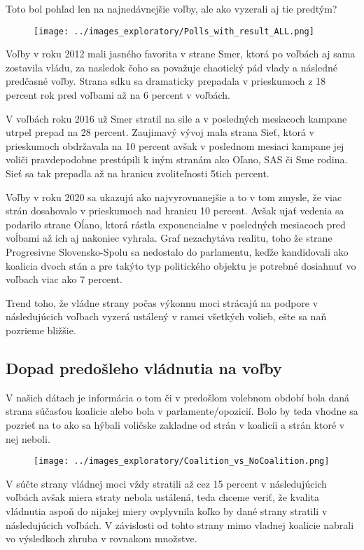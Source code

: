 \documentclass[main.tex]{subfiles}
\begin{document}
Toto bol pohľad len na najnedávnejšie voľby, ale ako vyzerali aj tie predtým?

\clearpage


\begin{figure}[!htbp]
    \centering
    \texttt{[image: ../images\_exploratory/Polls\_with\_result\_ALL.png]}
    \caption{}
    \label{fig:example}
\end{figure}

Voľby v roku 2012 mali jasného favorita v strane Smer, ktorá po voľbách aj sama zostavila vládu, za nasledok čoho sa považuje chaotický pád vlady a následné predčasné voľby. Strana sdku sa dramaticky prepadala v prieskumoch z 18 percent rok pred voľbami až na 6 percent v voľbách. 

V voľbách roku 2016 už Smer stratil na sile a v posledných mesiacoch kampane utrpel prepad na 28 percent. Zaujimavý vývoj mala strana Sieť, ktorá v prieskumoch obdržavala na 10 percent avšak v poslednom mesiaci kampane jej voliči pravdepodobne prestúpili k iným stranám ako Oľano, SAS či Sme rodina. Sieť sa tak prepadla až na hranicu zvoliteľnosti 5tich percent.

Voľby v roku 2020 sa ukazujú ako najvyrovnanejšie a to v tom zmysle, že viac strán dosahovalo v prieskumoch nad hranicu 10 percent. Avšak ujať vedenia sa podarilo strane Oĺano, ktorá rástla exponencialne v posledných mesiacoch pred voĺbami až ich aj nakoniec vyhrala. Graf nezachytáva realitu, toho že strane Progresivne Slovensko-Spolu sa nedostalo do parlamentu, keďže kandidovali ako koalicia dvoch stán a pre takýto typ politického objektu je potrebné dosiahnuť vo voľbach viac ako 7 percent. 

Trend toho, že vládne strany počas výkonnu moci strácajú na podpore v následujúcich voľbach vyzerá ustálený v ramci všetkých volieb, ešte sa naň pozrieme bližšie. 

\subsection{Dopad predošleho vládnutia na voľby}

V našich dátach je informácia o tom či v predošlom volebnom období bola daná strana súčasťou koalicie alebo bola v parlamente/opozicií. Bolo by teda vhodne sa pozrieť na to ako sa hýbali voličske zakladne od strán v koalicíi a strán ktoré v nej neboli. 
\begin{figure}[!htbp]
    \centering
    \texttt{[image: ../images\_exploratory/Coalition\_vs\_NoCoalition.png]}
    \caption{}
    \label{fig:example}
\end{figure}

V súčte strany vládnej moci vždy stratili až cez 15 percent v následujúcich voľbách avšak miera straty nebola ustálená, teda chceme veriť, že kvalita vládnutia aspoň do nijakej miery ovplyvnila koľko by dané strany stratili v následujúcich voľbách.
V závislosti od tohto strany mimo vladnej koalicie nabrali vo výsledkoch zhruba v rovnakom množstve. 
\end{document}
